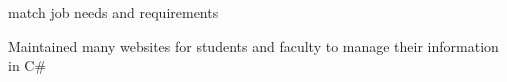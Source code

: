 \begin{myexp}
\begin{mybullet}
            match job needs and requirements
        \item Maintained many websites for students and faculty to manage 
            their information in C\#
    \end{mybullet}
\end{myexp}


